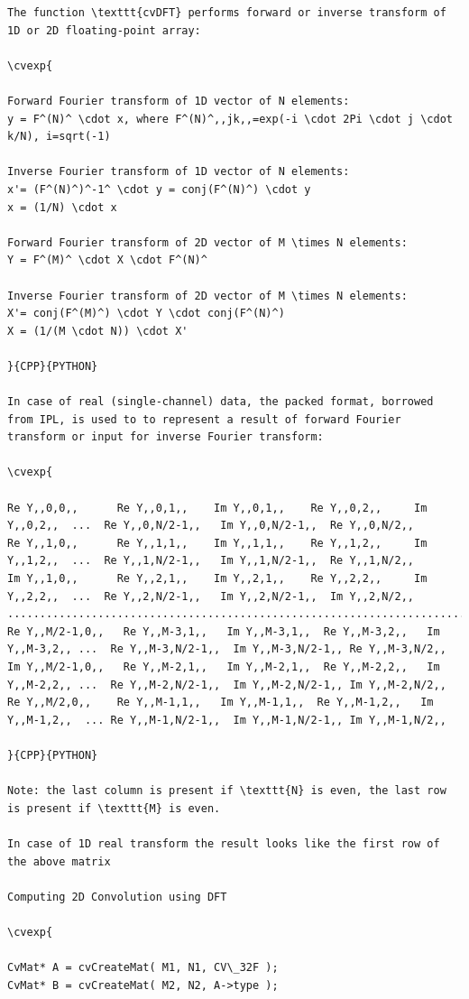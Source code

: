 \begin{verbatim}
The function \texttt{cvDFT} performs forward or inverse transform of 1D or 2D floating-point array:

\cvexp{

Forward Fourier transform of 1D vector of N elements:
y = F^(N)^ \cdot x, where F^(N)^,,jk,,=exp(-i \cdot 2Pi \cdot j \cdot k/N), i=sqrt(-1)

Inverse Fourier transform of 1D vector of N elements:
x'= (F^(N)^)^-1^ \cdot y = conj(F^(N)^) \cdot y
x = (1/N) \cdot x

Forward Fourier transform of 2D vector of M \times N elements:
Y = F^(M)^ \cdot X \cdot F^(N)^

Inverse Fourier transform of 2D vector of M \times N elements:
X'= conj(F^(M)^) \cdot Y \cdot conj(F^(N)^)
X = (1/(M \cdot N)) \cdot X'

}{CPP}{PYTHON}

In case of real (single-channel) data, the packed format, borrowed from IPL, is used to to represent a result of forward Fourier transform or input for inverse Fourier transform:

\cvexp{

Re Y,,0,0,,      Re Y,,0,1,,    Im Y,,0,1,,    Re Y,,0,2,,     Im Y,,0,2,,  ...  Re Y,,0,N/2-1,,   Im Y,,0,N/2-1,,  Re Y,,0,N/2,,
Re Y,,1,0,,      Re Y,,1,1,,    Im Y,,1,1,,    Re Y,,1,2,,     Im Y,,1,2,,  ...  Re Y,,1,N/2-1,,   Im Y,,1,N/2-1,,  Re Y,,1,N/2,,
Im Y,,1,0,,      Re Y,,2,1,,    Im Y,,2,1,,    Re Y,,2,2,,     Im Y,,2,2,,  ...  Re Y,,2,N/2-1,,   Im Y,,2,N/2-1,,  Im Y,,2,N/2,,
............................................................................................
Re Y,,M/2-1,0,,   Re Y,,M-3,1,,   Im Y,,M-3,1,,  Re Y,,M-3,2,,   Im Y,,M-3,2,, ...  Re Y,,M-3,N/2-1,,  Im Y,,M-3,N/2-1,, Re Y,,M-3,N/2,,
Im Y,,M/2-1,0,,   Re Y,,M-2,1,,   Im Y,,M-2,1,,  Re Y,,M-2,2,,   Im Y,,M-2,2,, ...  Re Y,,M-2,N/2-1,,  Im Y,,M-2,N/2-1,, Im Y,,M-2,N/2,,
Re Y,,M/2,0,,    Re Y,,M-1,1,,   Im Y,,M-1,1,,  Re Y,,M-1,2,,   Im Y,,M-1,2,,  ... Re Y,,M-1,N/2-1,,  Im Y,,M-1,N/2-1,, Im Y,,M-1,N/2,,

}{CPP}{PYTHON}

Note: the last column is present if \texttt{N} is even, the last row is present if \texttt{M} is even.

In case of 1D real transform the result looks like the first row of the above matrix

Computing 2D Convolution using DFT

\cvexp{

CvMat* A = cvCreateMat( M1, N1, CV\_32F );
CvMat* B = cvCreateMat( M2, N2, A->type );


\end{verbatim}
